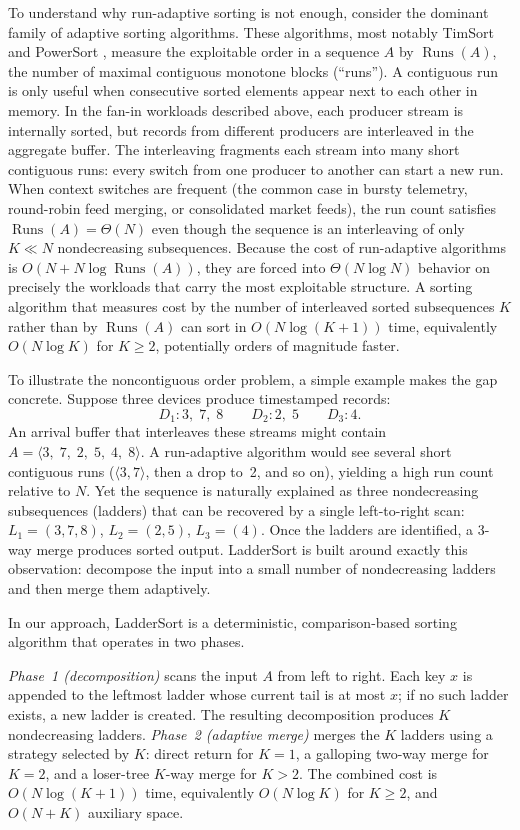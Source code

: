 \documentclass[12pt,a4paper]{article}
\theoremstyle{plain}
\theoremstyle{definition}
\DeclareMathOperator{\Runs}{Runs}
\begin{document}
To understand why run-adaptive sorting is not enough, consider
the dominant family of adaptive sorting algorithms.  These algorithms, most notably
TimSort \cite{Auger2018} and PowerSort \cite{MunroWild2018}, measure
the exploitable order in a sequence $A$ by $\Runs(A)$, the number of
maximal contiguous monotone blocks (``runs'').  A contiguous run is only
useful when consecutive sorted elements appear next to each other in
memory.  In the fan-in workloads described above, each producer stream is
internally sorted, but records from different producers are interleaved
in the aggregate buffer.  The interleaving fragments each stream into
many short contiguous runs: every switch from one producer to another can
start a new run.  When context switches are frequent (the common case in
bursty telemetry, round-robin feed merging, or consolidated market
feeds), the run count satisfies $\Runs(A) = \Theta(N)$ even though the
sequence is an interleaving of only $K \ll N$ nondecreasing
subsequences.  Because the cost of run-adaptive algorithms is
$O(N + N\log\Runs(A))$, they are forced into $\Theta(N\log N)$
behavior on precisely the workloads that carry the most exploitable
structure.  A sorting algorithm that measures cost by the number of
interleaved sorted subsequences $K$ rather than by $\Runs(A)$ can sort
in $O(N\log(K+1))$ time, equivalently $O(N\log K)$ for $K \ge 2$, potentially orders of magnitude faster.

To illustrate the noncontiguous order problem, a simple example makes
the gap concrete.  Suppose three devices produce timestamped records:
\[
  D_1: 3,\;7,\;8 \qquad
  D_2: 2,\;5      \qquad
  D_3: 4.
\]
An arrival buffer that interleaves these streams might contain
$A = \langle 3,\;7,\;2,\;5,\;4,\;8 \rangle$.
A run-adaptive algorithm would see several short contiguous runs
($\langle 3,7 \rangle$, then a drop to~2, and so on), yielding a high
run count relative to $N$.  Yet the sequence is naturally explained as
three nondecreasing subsequences (ladders) that can be recovered
by a single left-to-right scan:
$L_1 = (3,7,8)$, $L_2 = (2,5)$, $L_3 = (4)$.
Once the ladders are identified, a 3-way merge produces sorted output.
LadderSort is built around exactly this observation: decompose the input
into a small number of nondecreasing ladders and then merge them
adaptively.

In our approach, LadderSort is a deterministic, comparison-based sorting
algorithm that operates in two phases.

\emph{Phase~1 (decomposition)} scans the input $A$ from left to right.
Each key $x$ is appended to the leftmost ladder whose current tail is at
most $x$; if no such ladder exists, a new ladder is created.  The
resulting decomposition produces $K$ nondecreasing ladders.
\emph{Phase~2 (adaptive merge)} merges the $K$ ladders using a strategy
selected by $K$: direct return for $K=1$, a galloping two-way merge for
$K=2$, and a loser-tree $K$-way merge for $K > 2$.  The combined cost is
$O(N\log(K+1))$ time, equivalently $O(N\log K)$ for $K \ge 2$, and $O(N+K)$ auxiliary space.
\end{document}
